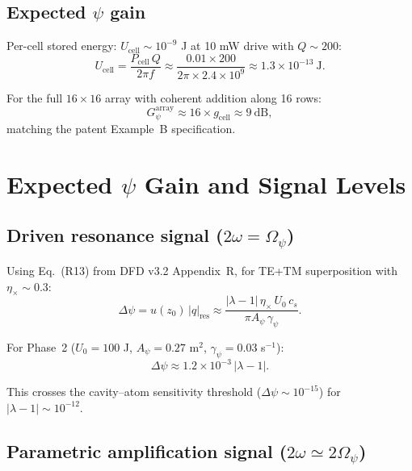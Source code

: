 \documentclass[12pt,letterpaper]{article}
\begin{document}
\subsection{Expected $\psi$ gain}

Per-cell stored energy: $U_{\text{cell}} \sim 10^{-9}$ J at
10 mW drive with $Q \sim 200$:
\begin{equation}
  U_{\text{cell}} = \frac{P_{\text{cell}}\,Q}{2\pi f}
  \approx \frac{0.01 \times 200}{2\pi \times 2.4\times 10^9}
  \approx 1.3\times 10^{-13}~\text{J}.
\end{equation}

For the full $16\times 16$ array with coherent addition along
16 rows:
\begin{equation}
  G_{\psi}^{\text{array}} \approx 16 \times g_{\text{cell}}
  \approx 9~\text{dB},
\end{equation}
matching the patent Example~B specification.

\section{Expected $\psi$ Gain and Signal Levels}

\subsection{Driven resonance signal ($2\omega = \Omega_\psi$)}

Using Eq.\ (R13) from DFD v3.2 Appendix~R, for TE+TM superposition
with $\eta_\times \sim 0.3$:
\begin{equation}
  \Delta\psi = u(z_0)\,|q|_{\text{res}}
  \approx \frac{|\lambda-1|\,\eta_\times\,U_0\,c_s}{\pi A_\psi\,\gamma_\psi}.
\end{equation}

For Phase~2 ($U_0 = 100$ J, $A_\psi = 0.27$ m$^2$,
$\gamma_\psi = 0.03$ s$^{-1}$):
\begin{equation}
  \Delta\psi \approx 1.2\times 10^{-3}\,|\lambda - 1|.
\end{equation}

This crosses the cavity--atom sensitivity threshold
($\Delta\psi \sim 10^{-15}$) for $|\lambda - 1| \sim 10^{-12}$.

\subsection{Parametric amplification signal ($2\omega \simeq 2\Omega_\psi$)}
\end{document}
